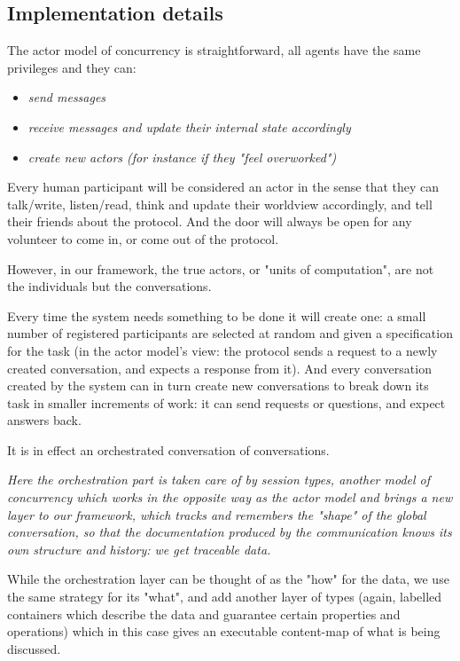\documentclass[11pt]{article}
\begin{document}
\subsection{Implementation details}

The actor model of concurrency is straightforward, all agents have the same privileges and they can:

\begin{itemize}

\item \emph{send messages}

\item \emph{receive messages and update their internal state accordingly}

\item \emph{create new actors (for instance if they "feel overworked")}

\end{itemize}

Every human participant will be considered an actor in the sense that they can talk/write, listen/read, think and update their worldview accordingly, and tell their friends about the protocol. And the door will always be open for any volunteer to come in, or come out of the protocol.

However, in our framework, the true actors, or "units of computation", are not the individuals but the conversations.

Every time the system needs something to be done it will create one: a small number of registered participants are selected at random and given a specification for the task (in the actor model's view: the protocol sends a request to a newly created conversation, and expects a response from it). And every conversation created by the system can in turn create new conversations to break down its task in smaller increments of work: it can send requests or questions, and expect answers back.

It is in effect an orchestrated conversation of conversations.

\emph{Here the orchestration part is taken care of by session types, another model of concurrency which works in the opposite way as the actor model and brings a new layer to our framework, which tracks and remembers the "shape" of the global conversation, so that the documentation produced by the communication knows its own structure and history: we get traceable data.}

While the orchestration layer can be thought of as the "how" for the data, we use the same strategy for its "what", and add another layer of types (again, labelled containers which describe the data and guarantee certain properties and operations) which in this case gives an executable content-map of what is being discussed.
\end{document}
